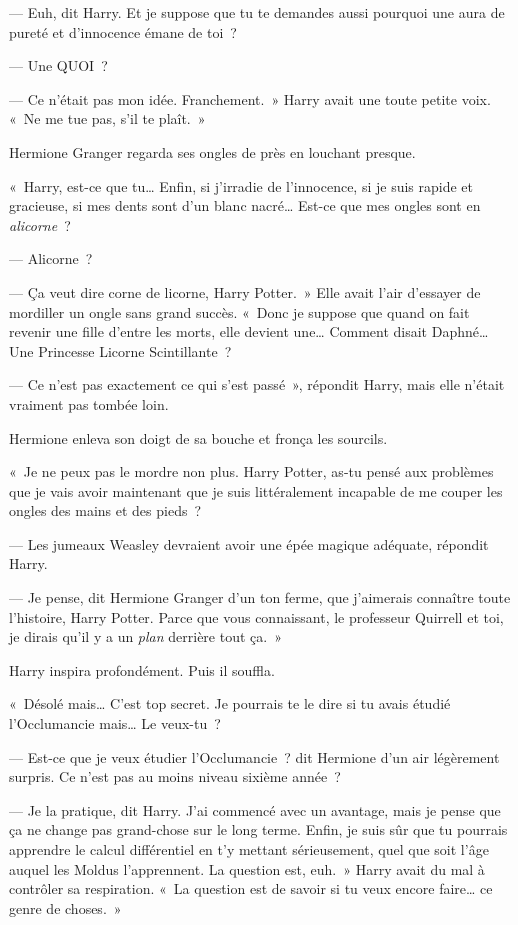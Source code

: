 --- Euh, dit Harry. Et je suppose que tu te demandes aussi pourquoi une aura de pureté et d'innocence émane de toi~?

--- Une QUOI~?

--- Ce n'était pas mon idée. Franchement.~» Harry avait une toute petite voix. «~Ne me tue pas, s'il te plaît.~»

Hermione Granger regarda ses ongles de près en louchant presque.

«~Harry, est-ce que tu… Enfin, si j'irradie de l'innocence, si je suis rapide et gracieuse, si mes dents sont d'un blanc nacré… Est-ce que mes ongles sont en \emph{alicorne}~?

--- Alicorne~?

--- Ça veut dire corne de licorne, Harry Potter.~» Elle avait l'air d'essayer de mordiller un ongle sans grand succès. «~Donc je suppose que quand on fait revenir une fille d'entre les morts, elle devient une… Comment disait Daphné… Une Princesse Licorne Scintillante~?

--- Ce n'est pas exactement ce qui s'est passé~», répondit Harry, mais elle n'était vraiment pas tombée loin.

Hermione enleva son doigt de sa bouche et fronça les sourcils.

«~Je ne peux pas le mordre non plus. Harry Potter, as-tu pensé aux problèmes que je vais avoir maintenant que je suis littéralement incapable de me couper les ongles des mains et des pieds~?

--- Les jumeaux Weasley devraient avoir une épée magique adéquate, répondit Harry.

--- Je pense, dit Hermione Granger d'un ton ferme, que j'aimerais connaître toute l'histoire, Harry Potter. Parce que vous connaissant, le professeur Quirrell et toi, je dirais qu'il y a un \emph{plan} derrière tout ça.~»

Harry inspira profondément. Puis il souffla.

«~Désolé mais… C'est top secret. Je pourrais te le dire si tu avais étudié l'Occlumancie mais… Le veux-tu~?

--- Est-ce que je veux étudier l'Occlumancie~? dit Hermione d'un air légèrement surpris. Ce n'est pas au moins niveau sixième année~?

--- Je la pratique, dit Harry. J'ai commencé avec un avantage, mais je pense que ça ne change pas grand-chose sur le long terme. Enfin, je suis sûr que tu pourrais apprendre le calcul différentiel en t'y mettant sérieusement, quel que soit l'âge auquel les Moldus l'apprennent. La question est, euh.~» Harry avait du mal à contrôler sa respiration. «~La question est de savoir si tu veux encore faire… ce genre de choses.~»

